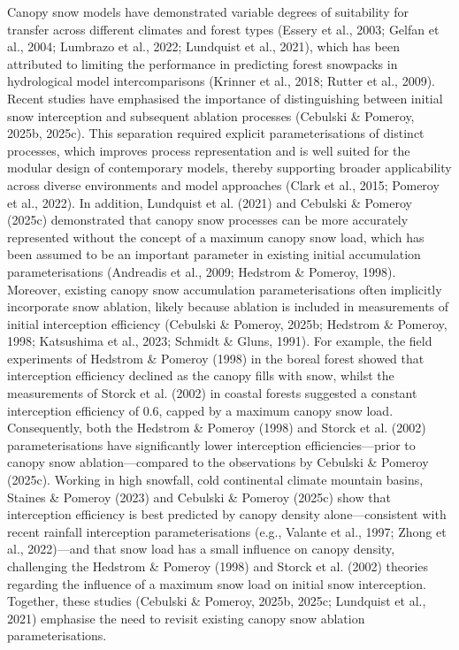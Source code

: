 \documentclass[
]{agujournal2019}
\begin{document}
Canopy snow models have demonstrated variable degrees of suitability for
transfer across different climates and forest types (Essery et al.,
2003; Gelfan et al., 2004; Lumbrazo et al., 2022; Lundquist et al.,
2021), which has been attributed to limiting the performance in
predicting forest snowpacks in hydrological model intercomparisons
(Krinner et al., 2018; Rutter et al., 2009). Recent studies have
emphasised the importance of distinguishing between initial snow
interception and subsequent ablation processes (Cebulski \& Pomeroy,
2025b, 2025c). This separation required explicit parameterisations of
distinct processes, which improves process representation and is well
suited for the modular design of contemporary models, thereby supporting
broader applicability across diverse environments and model approaches
(Clark et al., 2015; Pomeroy et al., 2022). In addition, Lundquist et
al. (2021) and Cebulski \& Pomeroy (2025c) demonstrated that canopy snow
processes can be more accurately represented without the concept of a
maximum canopy snow load, which has been assumed to be an important
parameter in existing initial accumulation parameterisations (Andreadis
et al., 2009; Hedstrom \& Pomeroy, 1998). Moreover, existing canopy snow
accumulation parameterisations often implicitly incorporate snow
ablation, likely because ablation is included in measurements of initial
interception efficiency (Cebulski \& Pomeroy, 2025b; Hedstrom \&
Pomeroy, 1998; Katsushima et al., 2023; Schmidt \& Gluns, 1991). For
example, the field experiments of Hedstrom \& Pomeroy (1998) in the
boreal forest showed that interception efficiency declined as the canopy
fills with snow, whilst the measurements of Storck et al. (2002) in
coastal forests suggested a constant interception efficiency of 0.6,
capped by a maximum canopy snow load. Consequently, both the Hedstrom \&
Pomeroy (1998) and Storck et al. (2002) parameterisations have
significantly lower interception efficiencies---prior to canopy snow
ablation---compared to the observations by Cebulski \& Pomeroy (2025c).
Working in high snowfall, cold continental climate mountain basins,
Staines \& Pomeroy (2023) and Cebulski \& Pomeroy (2025c) show that
interception efficiency is best predicted by canopy density
alone---consistent with recent rainfall interception parameterisations
(e.g., Valante et al., 1997; Zhong et al., 2022)---and that snow load
has a small influence on canopy density, challenging the Hedstrom \&
Pomeroy (1998) and Storck et al. (2002) theories regarding the influence
of a maximum snow load on initial snow interception. Together, these
studies (Cebulski \& Pomeroy, 2025b, 2025c; Lundquist et al., 2021)
emphasise the need to revisit existing canopy snow ablation
parameterisations.
\end{document}
